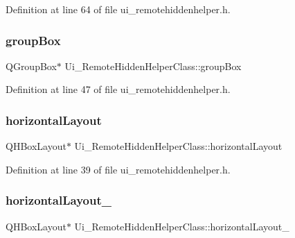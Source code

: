 Definition at line 64 of file ui\+\_\+remotehiddenhelper.\+h.

\hypertarget{class_ui___remote_hidden_helper_class_a1e32f50dddf9deebdf5e9c0acc5b95eb}{}\label{class_ui___remote_hidden_helper_class_a1e32f50dddf9deebdf5e9c0acc5b95eb} 
\subsubsection{\texorpdfstring{group\+Box}{groupBox}}
{\footnotesize\ttfamily Q\+Group\+Box$\ast$ Ui\+\_\+\+Remote\+Hidden\+Helper\+Class\+::group\+Box}



Definition at line 47 of file ui\+\_\+remotehiddenhelper.\+h.

\hypertarget{class_ui___remote_hidden_helper_class_ad5fcb5626484231afcfe7d8d11b89a6d}{}\label{class_ui___remote_hidden_helper_class_ad5fcb5626484231afcfe7d8d11b89a6d} 
\subsubsection{\texorpdfstring{horizontal\+Layout}{horizontalLayout}}
{\footnotesize\ttfamily Q\+H\+Box\+Layout$\ast$ Ui\+\_\+\+Remote\+Hidden\+Helper\+Class\+::horizontal\+Layout}



Definition at line 39 of file ui\+\_\+remotehiddenhelper.\+h.

\hypertarget{class_ui___remote_hidden_helper_class_a168bb48b75379a664f73ae108a00863f}{}\label{class_ui___remote_hidden_helper_class_a168bb48b75379a664f73ae108a00863f} 
\subsubsection{\texorpdfstring{horizontal\+Layout\+\_}{horizontalLayout\_2}}
{\footnotesize\ttfamily Q\+H\+Box\+Layout$\ast$ Ui\+\_\+\+Remote\+Hidden\+Helper\+Class\+::horizontal\+Layout\+\_}



